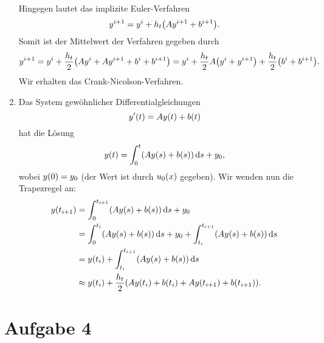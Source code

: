 \documentclass{exercise}
\begin{document}
\begin{enumerate}
\[        \]
        Hingegen lautet das implizite Euler-Verfahren
        \[
            y^{i + 1} = y^i + h_t\parentheses*{Ay^{i + 1} + b^{i + 1}}.
        \]
        Somit ist der Mittelwert der Verfahren gegeben durch
        \[
            y^{i + 1} = y^i + \frac{h_t}{2}\parentheses*{Ay^i + Ay^{i + 1} + b^i + b^{i + 1}} = y^i + \frac{h_t}{2}A\parentheses*{y^i + y^{i + 1}} + \frac{h_t}{2}\parentheses*{b^i + b^{i + 1}}.
        \]
        Wir erhalten das Crank-Nicolson-Verfahren.
        \item Das System gewöhnlicher Differentialgleichungen
        \[
            y'\parentheses*{t} = Ay\parentheses*{t} + b\parentheses*{t}
        \]
        hat die Lösung
        \[
            y\parentheses*{t} = \int_0^t \parentheses*{Ay\parentheses*{s} + b\parentheses*{s}}\d s + y_0,
        \]
        wobei \(y\parentheses*{0} = y_0\) (der Wert ist durch \(u_0\parentheses*{x}\) gegeben).
        Wir wenden nun die Trapezregel an:
        \begin{align*}
            y\parentheses*{t_{i + 1}} &= \int_0^{t_{i + 1}}\parentheses*{Ay\parentheses*{s} + b\parentheses*{s}}\d s + y_0\\
            &= \int_0^{t_i}\parentheses*{Ay\parentheses*{s} + b\parentheses*{s}}\d s + y_0 + \int_{t_i}^{t_{i + 1}}\parentheses*{Ay\parentheses*{s} + b\parentheses*{s}}\d s\\
            &= y\parentheses*{t_i} + \int_{t_i}^{t_{i + 1}}\parentheses*{Ay\parentheses*{s} + b\parentheses*{s}}\d s\\
            &\approx y\parentheses*{t_i} + \frac{h_t}{2}\parentheses*{Ay\parentheses*{t_i} + b\parentheses*{t_i} + Ay\parentheses*{t_{i + 1}} + b\parentheses*{t_{i + 1}}}.
        \end{align*}
    \end{enumerate}


    \section*{Aufgabe 4}
    
\end{document}
